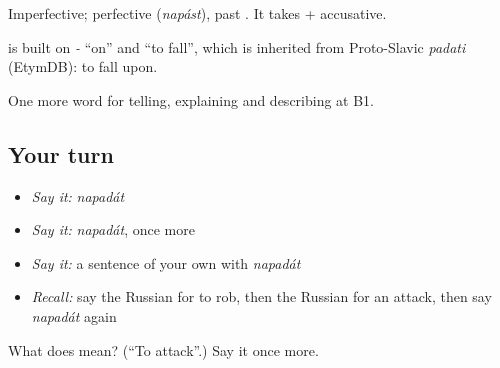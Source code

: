 Imperfective; perfective \emph{} (\emph{napást}), past \emph{}. It takes \emph{} + accusative.

\begin{cousinweb}
\emph{} is built on \emph{-} \textquotedblleft{}on\textquotedblright{} and \emph{} \textquotedblleft{}to fall\textquotedblright{}, which is inherited from Proto-Slavic \emph{padati} (EtymDB): to fall upon.
\end{cousinweb}

\begin{grammarlens}[title={What you've built}]
One more word for telling, explaining and describing at B1.
\end{grammarlens}

\subsection*{Your turn}
\begin{itemize}
\raggedright
  \item \emph{Say it:} \emph{napadát}
  \item \emph{Say it:} \emph{napadát}, once more
  \item \emph{Say it:} a sentence of your own with \emph{napadát}
  \item \emph{Recall:} say the Russian for to rob, then the Russian for an attack, then say \emph{napadát} again
\end{itemize}

\begin{tcolorbox}[breakable,colback=teal!4,colframe=teal!35!black,title={Before you move on}]
What does  mean? (\textquotedblleft{}To attack\textquotedblright{}.) Say it once more.
\end{tcolorbox}
